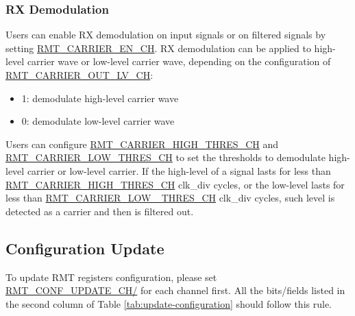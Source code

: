 \documentclass[main\_\_EN.tex]{subfiles}
\begin{document}
\subsubsection{RX Demodulation}

Users can enable RX demodulation on input signals or on filtered signals by setting \hyperref[fielddesc:RMTCARRIERENCHM]{RMT\_CARRIER\_EN\_CH}. RX demodulation can be applied to high-level carrier wave or low-level carrier wave, depending on the configuration of \hyperref[fielddesc:RMTCARRIEROUTLVCHM]{RMT\_CARRIER\_OUT\_LV\_CH}:
\begin{itemize}
    \item 1: demodulate high-level carrier wave
    \item 0: demodulate low-level carrier wave
\end{itemize}


Users can configure \hyperref[fielddesc:RMTCARRIERHIGHTHRESCHM]{RMT\_CARRIER\_HIGH\_THRES\_CH} and \hyperref[fielddesc:RMTCARRIERLOWTHRESCHM]{RMT\_CARRIER\_LOW\_THRES\_CH} to set the thresholds to demodulate high-level carrier or low-level carrier. If the high-level of a signal lasts for less than \hyperref[fielddesc:RMTCARRIERHIGHTHRESCHM]{RMT\_CARRIER\_HIGH\_THRES\_CH} clk\_div cycles, or the low-level lasts for less than \hyperref[fielddesc:RMTCARRIERLOWTHRESCHM]{RMT\_CARRIER\_LOW \_THRES\_CH} clk\_div cycles, such level is detected as a carrier and then is filtered out.

\subsection{Configuration Update}\label{conf_update}
To update RMT registers configuration, please set \hyperref[fielddesc:RMTCONFUPDATECHN]{RMT\_CONF\_UPDATE\_CH/} for each channel first. All the bits/fields listed in the second column of Table  \ref{tab:update-configuration} should follow this rule.
\end{document}
